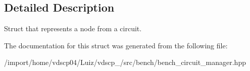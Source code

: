 \subsection{Detailed Description}
Struct that represents a node from a circuit. 

The documentation for this struct was generated from the following file\+:\begin{DoxyCompactItemize}
\item 
/import/home/vdscp04/\+Luiz/vdscp\+\_/src/bench/bench\+\_\+circuit\+\_\+manager.\+hpp\end{DoxyCompactItemize}
